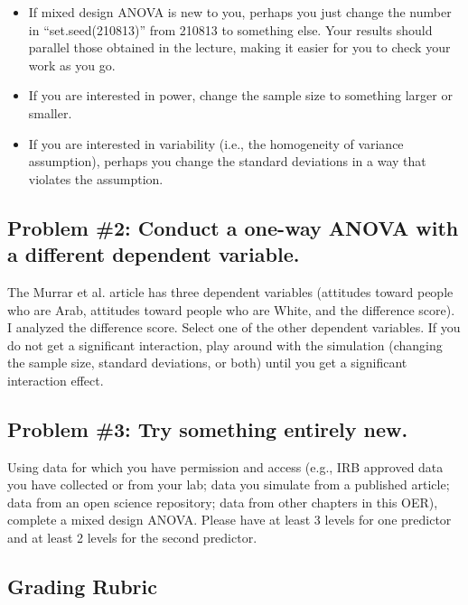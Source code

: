 \documentclass[
  11pt,
]{book}
\providecommand{\tightlist}{%
  \setlength{\itemsep}{0pt}\setlength{\parskip}{0pt}}
\begin{document}
\begin{itemize}
\tightlist
\item
  If mixed design ANOVA is new to you, perhaps you just change the number in ``set.seed(210813)'' from 210813 to something else. Your results should parallel those obtained in the lecture, making it easier for you to check your work as you go.
\item
  If you are interested in power, change the sample size to something larger or smaller.
\item
  If you are interested in variability (i.e., the homogeneity of variance assumption), perhaps you change the standard deviations in a way that violates the assumption.
\end{itemize}

\hypertarget{problem-2-conduct-a-one-way-anova-with-a-different-dependent-variable.}{%
\subsection{Problem \#2: Conduct a one-way ANOVA with a different dependent variable.}\label{problem-2-conduct-a-one-way-anova-with-a-different-dependent-variable.}}

The Murrar et al. \citeyearpar{murrar_entertainment-education_2018} article has three dependent variables (attitudes toward people who are Arab, attitudes toward people who are White, and the difference score). I analyzed the difference score. Select one of the other dependent variables. If you do not get a significant interaction, play around with the simulation (changing the sample size, standard deviations, or both) until you get a significant interaction effect.

\hypertarget{problem-3-try-something-entirely-new.-2}{%
\subsection{Problem \#3: Try something entirely new.}\label{problem-3-try-something-entirely-new.-2}}

Using data for which you have permission and access (e.g., IRB approved data you have collected or from your lab; data you simulate from a published article; data from an open science repository; data from other chapters in this OER), complete a mixed design ANOVA. Please have at least 3 levels for one predictor and at least 2 levels for the second predictor.

\hypertarget{grading-rubric-4}{%
\subsection{Grading Rubric}\label{grading-rubric-4}}
\end{document}

